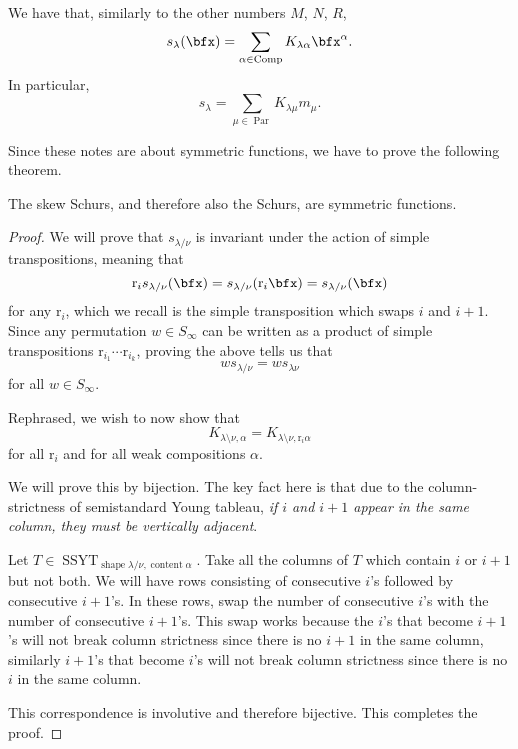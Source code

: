 \documentclass{article}
\DeclareMathOperator{\shape}{shape}
\DeclareMathOperator{\content}{content}
\DeclareMathOperator{\Par}{Par}
\DeclareMathOperator{\Com}{Comp}
\DeclareMathOperator{\SSYT}{SSYT}
\newcommand*\refl{\ensuremath{\text{r}}}
\begin{document}
\begin{remark}
    We have that, similarly to the other numbers $M$, $N$, $R$,
    \[
        s_\lambda(\bfx)
        = 
        \sum_{\alpha\in\Com} K_{\lambda\alpha}\bfx^\alpha.
    \]
    In particular,
    \[
        s_\lambda
        = 
        \sum_{\mu\in\Par} 
        K_{\lambda\mu}m_\mu.
    \]
\end{remark}

Since these notes are about symmetric functions, we have to prove the following theorem.

\begin{theorem} The skew Schurs, and therefore also the Schurs, are symmetric functions.
\end{theorem}

\begin{proof}
    We will prove that $s_{\lambda/\nu}$ is invariant under the action of simple transpositions, meaning that
    \[
        \refl_i s_{\lambda/\nu} (\bfx)
        = 
        s_{\lambda/\nu} (\refl_i \bfx)
        =
        s_{\lambda/\nu} (\bfx)
    \]
    for any $\refl_i$, which we recall is the simple transposition which swaps $i$ and $i+1$.
    Since any permutation $w \in S_\infty$ can be written as a product of simple transpositions $\refl_{i_1}\cdots \refl_{i_k}$, proving the above tells us that 
    \[
        ws_{\lambda/\nu} 
        = 
        ws_{\lambda\nu}
    \]
    for all $w \in S_\infty$.

    Rephrased, we wish to now show that 
    \[
        K_{\lambda\setminus\nu,\alpha} 
        = 
        K_{\lambda\setminus\nu,\refl_i\alpha}
    \]
    for all $\refl_i$ and for all weak compositions $\alpha$.

    We will prove this by bijection.
    The key fact here is that due to the column-strictness of semistandard Young tableau, \textit{if $i$ and $i+1$ appear in the same column, they must be vertically adjacent}. 

    Let $T\in\SSYT_{\shape \lambda/\nu,\content \alpha}$. 
    Take all the columns of $T$ which contain $i$ or $i+1$ but not both. 
    We will have rows consisting of consecutive $i$'s followed by consecutive $i+1$'s. 
    In these rows, swap the number of consecutive $i$'s with the number of consecutive $i+1$'s. 
    This swap works because the $i$'s that become $i+1$'s will not break column strictness since there is no $i+1$ in the same column, similarly $i+1$'s that become $i$'s will not break column strictness since there is no $i$ in the same column.

    This correspondence is involutive and therefore bijective. This completes the proof.
\end{proof}
\end{document}
